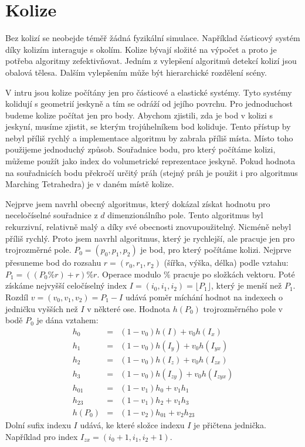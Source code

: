 
\section{Kolize}

Bez kolizí se neobejde téměř žádná fyzikální simulace.
Například částicový systém díky kolizím interaguje s okolím.
Kolize bývají složité na výpočet a proto je potřeba algoritmy zefektivňovat.
Jedním z vylepšení algoritmů detekcí kolizí jsou obalová tělesa.
Dalším vylepšením může být hierarchické rozdělení scény.

V intru jsou kolize počítány jen pro částicové a elastické systémy.
Tyto systémy kolidují s geometrií jeskyně a tím se odráží od jejího povrchu.
Pro jednoduchost budeme kolize počítat jen pro body.
Abychom zjistili, zda je bod v kolizi s jeskyní, musíme zjistit, se kterým trojúhelníkem bod koliduje.
Tento přístup by nebyl příliš rychlý a implementace algoritmu by zabrala příliš místa.
Místo toho použijeme jednoduchý způsob.
Souřadnice bodu, pro který počítáme kolizi, můžeme použít jako index do volumetrické reprezentace jeskyně.
Pokud hodnota na souřadnicích bodu překročí určitý práh (stejný práh je použit i pro algoritmus Marching Tetrahedra) je v daném místě kolize.

Nejprve jsem navrhl obecný algoritmus, který dokázal získat hodnotu pro neceločíselné souřadnice z $d$ dimenzionálního pole.
Tento algoritmus byl rekurzivní, relativně malý a díky své obecnosti znovupoužitelný.
Nicméně nebyl příliš rychlý.
Proto jsem navrhl algoritmus, který je rychlejší, ale pracuje jen pro trojrozměrné pole.
$P_0=(p_0,p_1,p_2)$ je bod, pro který počítáme kolizi.
Nejprve přesuneme bod do rozsahu $r=(r_0,r_1,r_2)$ (šířka, výška, délka) podle vztahu: $P_1=((P_0 \% r) + r) \% r$.
Operace modulo $\%$ pracuje po složkách vektoru.
Poté získáme nejvyšší celočíselný index $I=(i_0,i_1,i_2)=\lfloor P_1 \rfloor$, který je menší než $P_1$.
Rozdíl $v=(v_0,v_1,v_2)=P_1-I$ udává poměr míchání hodnot na indexech o jedničku vyšších než $I$ v některé ose.
Hodnota $h(P_0)$ trojrozměrného pole v bodě $P_0$ je dána vztahem:
\begin{eqnarray*}
\label{eq:kolid}
h_0    &=& (1-v_0)h(I)      + v_0h(I_{x}) \\
h_1    &=& (1-v_0)h(I_y)    + v_0h(I_{yx}) \\
h_2    &=& (1-v_0)h(I_z)    + v_0h(I_{zx}) \\
h_3    &=& (1-v_0)h(I_{zy}) + v_0h(I_{zyx}) \\
h_{01} &=& (1-v_1)h_0       + v_1h_1 \\
h_{23} &=& (1-v_1)h_2       + v_1h_3 \\
h(P_0) &=& (1-v_2)h_{01}    + v_2h_{23}
\end{eqnarray*}
Dolní sufix indexu $I$ udává, ke které složce indexu $I$ je přičtena jednička.
Například pro index $I_{zx}=(i_0+1,i_1,i_2+1)$.

